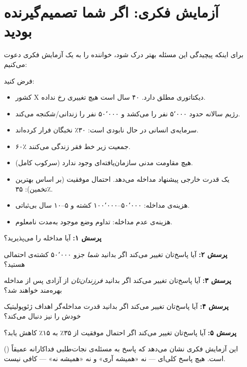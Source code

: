 \section{آزمایش فکری: اگر شما تصمیم‌گیرنده بودید}
\label{sec:ch15-thought-experiment}

برای اینکه پیچیدگی این مسئله بهتر درک شود، خواننده را به یک آزمایش فکری دعوت می‌کنیم:

\begin{tcolorbox}[wavebox, title={آزمایش فکری: کشور X}]
فرض کنید:
\begin{itemize}
\item کشور X دیکتاتوری مطلق دارد. ۴۰ سال است هیچ تغییری رخ نداده.
\item رژیم سالانه حدود ۵٬۰۰۰ نفر را می‌کشد و ۵۰٬۰۰۰ نفر را زندانی/شکنجه می‌کند.
\item سرمایه‌ی انسانی در حال نابودی است: ۳۰٪ نخبگان فرار کرده‌اند.
\item ۶۰٪ جمعیت زیر خط فقر زندگی می‌کنند.
\item هیچ مقاومت مدنی سازمان‌یافته‌ای وجود ندارد (سرکوب کامل).
\item یک قدرت خارجی پیشنهاد مداخله می‌دهد. احتمال موفقیت (بر اساس بهترین تخمین): ۳۵٪.
\item هزینه‌ی مداخله: ۵۰٬۰۰۰–۱۰۰٬۰۰۰ کشته و ۵–۱۰ سال بی‌ثباتی.
\item هزینه‌ی عدم مداخله: تداوم وضع موجود به‌مدت نامعلوم.
\end{itemize}

\textbf{پرسش ۱:} آیا مداخله را می‌پذیرید؟

\textbf{پرسش ۲:} آیا پاسخ‌تان تغییر می‌کند اگر بدانید \textit{شما} جزو ۵۰٬۰۰۰ کشته‌ی احتمالی هستید؟

\textbf{پرسش ۳:} آیا پاسخ‌تان تغییر می‌کند اگر بدانید \textit{فرزندان‌تان} از آزادی پس از مداخله بهره‌مند خواهند شد؟

\textbf{پرسش ۴:} آیا پاسخ‌تان تغییر می‌کند اگر بدانید قدرت مداخله‌گر اهداف ژئوپولیتیک خودش را نیز دنبال می‌کند؟

\textbf{پرسش ۵:} آیا پاسخ‌تان تغییر می‌کند اگر احتمال موفقیت از ۳۵٪ به ۱۵٪ کاهش یابد؟
\end{tcolorbox}

این آزمایش فکری نشان می‌دهد که پاسخ به مسئله‌ی نجات‌طلبی فداکارانه عمیقاً  () است. هیچ پاسخ کلی‌ای — نه «همیشه آری» و نه «همیشه نه» — کافی نیست.


